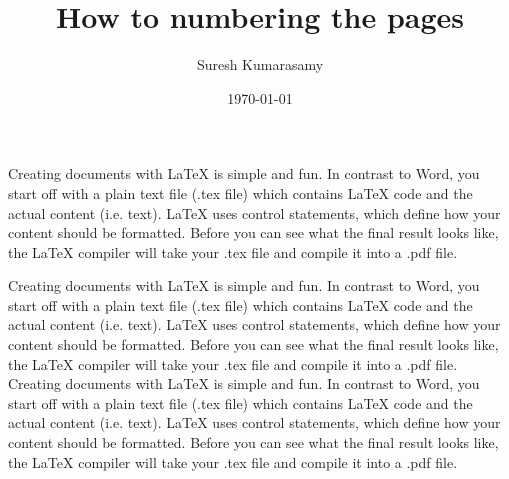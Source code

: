 \documentclass[12pt,draft,onecolumn]{article}
\title{How to numbering the pages}
\date{\today}
\author{Suresh Kumarasamy}
\begin{document}
  \maketitle
Creating documents with LaTeX is simple and fun. In contrast to Word, you start off with a plain text file (.tex file) which contains LaTeX code and the actual content (i.e. text). LaTeX uses control statements, which define how your content should be formatted. Before you can see what the final result looks like, the LaTeX compiler will take your .tex file and compile it into a .pdf file.

  \newpage

Creating documents with LaTeX is simple and fun. In contrast to Word, you start off with a plain text file (.tex file) which contains LaTeX code and the actual content (i.e. text). LaTeX uses control statements, which define how your content should be formatted. Before you can see what the final result looks like, the LaTeX compiler will take your .tex file and compile it into a .pdf file.
\newpage
Creating documents with LaTeX is simple and fun. In contrast to Word, you start off with a plain text file (.tex file) which contains LaTeX code and the actual content (i.e. text). LaTeX uses control statements, which define how your content should be formatted. Before you can see what the final result looks like, the LaTeX compiler will take your .tex file and compile it into a .pdf file.
\end{document}
